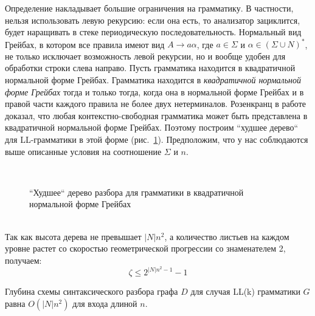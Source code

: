 \documentclass{spbau-diploma}
\begin{document}
Определение накладывает большие ограничения на грамматику. В частности, нельзя использовать левую рекурсию: если она есть, то анализатор зациклится, будет наращивать в стеке периодическую последовательность. Нормальный вид Грейбах, в котором все правила имеют вид $A \rightarrow a \alpha$, где $a \in \Sigma$ и $\alpha \in (\Sigma \cup N)^*$, не только исключает возможность левой рекурсии, но и вообще удобен для обработки строки слева направо. Пусть грамматика находится в квадратичной нормальной форме Грейбах. Грамматика находится в \textit{квадратичной нормальной форме Грейбах} тогда и только тогда, когда она в нормальной форме Грейбах и в правой части каждого правила не более двух нетерминалов. Розенкранц в работе \cite{QuadGreib} доказал, что любая контекстно-свободная грамматика может быть представлена в квадратичной нормальной форме Грейбах. Поэтому построим ``худшее дерево`` для LL-грамматики в этой форме (рис.~\ref{LLw}). Предположим, что у нас соблюдаются выше описанные условия на соотношение $\Sigma$ и $n$. 
\\
\begin{figure}
\centering
{}
 \\
	\caption{``Худшее`` дерево разбора для грамматики в квадратичной нормальной форме Грейбах}
\label{LLw}
\end{figure}
\\
Так как высота дерева не превышает $|N|n^2$, а количество листьев на каждом уровне растет со скоростью геометрической прогрессии со знаменателем 2, получаем:
\begin{equation}
\zeta \le  2^{|N|n^2 - 1} - 1
\end{equation}
\begin{corollaryrus} 
Глубина схемы синтаксического разбора графа $D$ для случая LL(k) грамматики $G$ равна $O(|N|n^2)$ для входа длиной $n$.
\end{corollaryrus}
\end{document}
